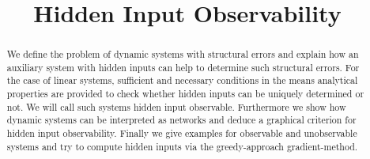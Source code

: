 
\title{Hidden Input Observability}
\maketitle

\thispagestyle{empty}
\begin{abstract}
We define the problem of dynamic systems with structural errors and explain how 
an auxiliary system with hidden inputs can help to determine such structural errors. 
For the case of linear systems, sufficient and necessary conditions in the means analytical 
properties are provided to check whether hidden inputs can be uniquely determined or not. 
We will call such systems hidden input observable.
Furthermore we show how dynamic systems can be interpreted as networks and deduce a graphical 
criterion for hidden input observability.
Finally we give examples for observable and unobservable systems and try to compute 
hidden inputs via the greedy-approach gradient-method.
\end{abstract}

\clearpage
\thispagestyle{empty}
\tableofcontents

